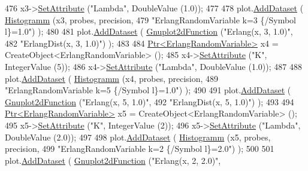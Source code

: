 \begin{DoxyCode}
476     x3->\hyperlink{classns3_1_1ObjectBase_ac60245d3ea4123bbc9b1d391f1f6592f}{SetAttribute} (\textcolor{stringliteral}{"Lambda"}, DoubleValue (1.0));
477 
478     plot.\hyperlink{classns3_1_1Gnuplot_a306ec724a327cf9ab699700f31fca0a1}{AddDataset} ( \hyperlink{main-random-variable-stream_8cc_a2cfd3837ab3f2e816cf53486d7a186b5}{Histogramm} (x3, probes, precision,
479                                   \textcolor{stringliteral}{"ErlangRandomVariable k=3 \{/Symbol l\}=1.0"}) );
480 
481     plot.\hyperlink{classns3_1_1Gnuplot_a306ec724a327cf9ab699700f31fca0a1}{AddDataset} ( \hyperlink{classns3_1_1Gnuplot2dFunction}{Gnuplot2dFunction} (\textcolor{stringliteral}{"Erlang(x, 3, 1.0)"},
482                                          \textcolor{stringliteral}{"ErlangDist(x, 3, 1.0)"}) );
483 
484     \hyperlink{classns3_1_1Ptr}{Ptr<ErlangRandomVariable>} x4 = CreateObject<ErlangRandomVariable> ();
485     x4->\hyperlink{classns3_1_1ObjectBase_ac60245d3ea4123bbc9b1d391f1f6592f}{SetAttribute} (\textcolor{stringliteral}{"K"}, IntegerValue (5));
486     x4->\hyperlink{classns3_1_1ObjectBase_ac60245d3ea4123bbc9b1d391f1f6592f}{SetAttribute} (\textcolor{stringliteral}{"Lambda"}, DoubleValue (1.0));
487 
488     plot.\hyperlink{classns3_1_1Gnuplot_a306ec724a327cf9ab699700f31fca0a1}{AddDataset} ( \hyperlink{main-random-variable-stream_8cc_a2cfd3837ab3f2e816cf53486d7a186b5}{Histogramm} (x4, probes, precision,
489                                   \textcolor{stringliteral}{"ErlangRandomVariable k=5 \{/Symbol l\}=1.0"}) );
490 
491     plot.\hyperlink{classns3_1_1Gnuplot_a306ec724a327cf9ab699700f31fca0a1}{AddDataset} ( \hyperlink{classns3_1_1Gnuplot2dFunction}{Gnuplot2dFunction} (\textcolor{stringliteral}{"Erlang(x, 5, 1.0)"},
492                                          \textcolor{stringliteral}{"ErlangDist(x, 5, 1.0)"}) );
493 
494     \hyperlink{classns3_1_1Ptr}{Ptr<ErlangRandomVariable>} x5 = CreateObject<ErlangRandomVariable> ();
495     x5->\hyperlink{classns3_1_1ObjectBase_ac60245d3ea4123bbc9b1d391f1f6592f}{SetAttribute} (\textcolor{stringliteral}{"K"}, IntegerValue (2));
496     x5->\hyperlink{classns3_1_1ObjectBase_ac60245d3ea4123bbc9b1d391f1f6592f}{SetAttribute} (\textcolor{stringliteral}{"Lambda"}, DoubleValue (2.0));
497 
498     plot.\hyperlink{classns3_1_1Gnuplot_a306ec724a327cf9ab699700f31fca0a1}{AddDataset} ( \hyperlink{main-random-variable-stream_8cc_a2cfd3837ab3f2e816cf53486d7a186b5}{Histogramm} (x5, probes, precision,
499                                   \textcolor{stringliteral}{"ErlangRandomVariable k=2 \{/Symbol l\}=2.0"}) );
500 
501     plot.\hyperlink{classns3_1_1Gnuplot_a306ec724a327cf9ab699700f31fca0a1}{AddDataset} ( \hyperlink{classns3_1_1Gnuplot2dFunction}{Gnuplot2dFunction} (\textcolor{stringliteral}{"Erlang(x, 2, 2.0)"},

\end{DoxyCode}
